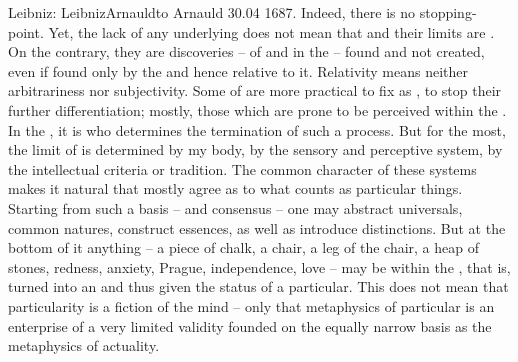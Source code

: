 \pa Leibniz: \citet{Fictions of the mind, everywhere; and if we cannot discover
  what is truly a complete being, or a substance, we will have no stopping-point
  [...]}{LeibnizArnauld}{to Arnauld 30.04 1687.}  Indeed, there is no stopping-point.
Yet, the lack of any underlying  does not mean that
 and their limits are .  On the
contrary, they are discoveries --  of and in the
 -- found and not created, even if found only by the
 and hence relative to it.  Relativity 
means neither arbitrariness nor subjectivity.  Some of  are more
practical to fix as , to stop their further differentiation; mostly,
those which are prone to be perceived within the \hoa.  In the , it is  who determines the termination of such
a process. But for the most, the limit of  is determined by
my body, by the sensory and perceptive system, by the intellectual criteria or
tradition.  The common character of these systems makes it natural that 
mostly agree as to what counts as particular things.  Starting from such a basis
-- and consensus -- one may abstract universals, common natures, construct
essences, as well as introduce distinctions. But at the bottom of it anything --
a piece of chalk, a chair, a leg of the chair, a heap of stones, redness,
  anxiety, Prague, 
independence, love -- may be  within the \hoa, that is, turned into
an  and thus given the status of a particular. This does
not mean that particularity is a fiction of the mind -- only that metaphysics of
particular  is
an enterprise of a very limited validity founded on the equally narrow basis as
the metaphysics of actuality.

